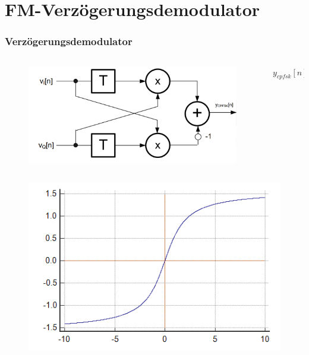 \documentclass{beamer}
\begin{document}
\section{FM-Verzögerungsdemodulator}

\begin{frame}
	\frametitle{Verzögerungsdemodulator}
	\begin{columns}
		\begin{column}{0.7\textwidth}
	\begin{figure}
		\centering
		\includegraphics[height=0.4\textheight]{images/fm_demod_no_asin}
		\label{fig:fmdemodnoasin}
	\end{figure}
	\end{column}
\begin{column}{0.3\textwidth}
	$y_{cpfsk}[n] = sin(\omega_0)$
		\end{column}
	\end{columns}
	\begin{columns}
		\begin{column}{0.5\textwidth}
			\begin{figure}
				\centering
				\includegraphics[width=0.8\linewidth]{images/asin}
				\label{fig:asin}
			\end{figure}
			

\end{column}
\end{columns}
\end{frame}
\end{document}

